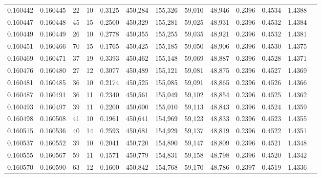 \begin{tabular}{rrrrrrrrrrrrr}
0.160442 & 0.160445 &    22 &  10 &                                     0.3125 & 450,284 & 155,326 &  59,010 &  48,946 & 0.2396 & 0.4534 & 1.4388 \\
0.160447 & 0.160448 &    45 &  15 &                                     0.2500 & 450,329 & 155,281 &  59,025 &  48,931 & 0.2396 & 0.4532 & 1.4384 \\
0.160449 & 0.160449 &    26 &  10 &                                     0.2778 & 450,355 & 155,255 &  59,035 &  48,921 & 0.2396 & 0.4532 & 1.4381 \\
0.160451 & 0.160466 &    70 &  15 &                                     0.1765 & 450,425 & 155,185 &  59,050 &  48,906 & 0.2396 & 0.4530 & 1.4375 \\
0.160469 & 0.160471 &    37 &  19 &                                     0.3393 & 450,462 & 155,148 &  59,069 &  48,887 & 0.2396 & 0.4528 & 1.4371 \\
0.160476 & 0.160480 &    27 &  12 &                                     0.3077 & 450,489 & 155,121 &  59,081 &  48,875 & 0.2396 & 0.4527 & 1.4369 \\
0.160481 & 0.160485 &    36 &  10 &                                     0.2174 & 450,525 & 155,085 &  59,091 &  48,865 & 0.2396 & 0.4526 & 1.4366 \\
0.160487 & 0.160491 &    36 &  11 &                                     0.2340 & 450,561 & 155,049 &  59,102 &  48,854 & 0.2396 & 0.4525 & 1.4362 \\
0.160493 & 0.160497 &    39 &  11 &                                     0.2200 & 450,600 & 155,010 &  59,113 &  48,843 & 0.2396 & 0.4524 & 1.4359 \\
0.160498 & 0.160508 &    41 &  10 &                                     0.1961 & 450,641 & 154,969 &  59,123 &  48,833 & 0.2396 & 0.4523 & 1.4355 \\
0.160515 & 0.160536 &    40 &  14 &                                     0.2593 & 450,681 & 154,929 &  59,137 &  48,819 & 0.2396 & 0.4522 & 1.4351 \\
0.160537 & 0.160552 &    39 &  10 &                                     0.2041 & 450,720 & 154,890 &  59,147 &  48,809 & 0.2396 & 0.4521 & 1.4348 \\
0.160555 & 0.160567 &    59 &  11 &                                     0.1571 & 450,779 & 154,831 &  59,158 &  48,798 & 0.2396 & 0.4520 & 1.4342 \\
0.160570 & 0.160590 &    63 &  12 &                                     0.1600 & 450,842 & 154,768 &  59,170 &  48,786 & 0.2397 & 0.4519 & 1.4336 \\

\end{tabular}
